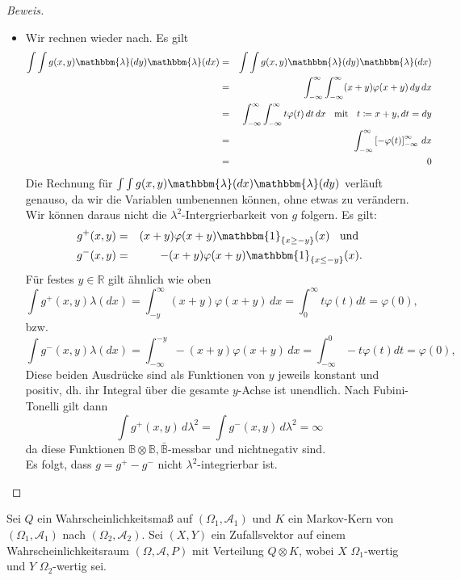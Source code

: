 \documentclass[10pt]{article}
\newcommand{\A}{\mathcal{A}}
\newenvironment{Aufgabe}[2][Aufgabe]{\begin{trivlist}
\item[\hskip \labelsep {\bfseries #1}\hskip \labelsep {\bfseries #2.}]}{\end{trivlist}}
\begin{document}
\begin{proof}[Beweis]
\begin{itemize}
\item[(ii)]
Wir rechnen wieder nach. Es gilt
\begin{eqnarray*}
\int \int g(x,y) \mathbbm{\lambda}(dy) \mathbbm{\lambda}(dx) &=& \int \int g(x,y) \mathbbm{\lambda}(dy) \mathbbm{\lambda}(dx) \\
											     &=& \int_{-\infty}^{\infty} \int_{-\infty}^{\infty} (x+y)\varphi(x+y) \, dy \,dx \\
											     &=& \int_{-\infty}^{\infty}  \int_{-\infty}^{\infty} t \varphi(t) \,dt \, dx \;\; \text{ mit } \;\; t \coloneqq x+y, dt = dy \\
											     &=& \int_{-\infty}^{\infty} \left[-\varphi(t) \right]_{-\infty}^{\infty} \,dx \\
											     &=& 0
\end{eqnarray*}
Die Rechnung für $\int \int g(x,y) \mathbbm{\lambda}(dx) \mathbbm{\lambda}(dy)$ verläuft genauso, da wir die Variablen umbenennen können, ohne etwas zu verändern. \\
Wir können daraus nicht die $\lambda^2$-Intergrierbarkeit von $g$ folgern. Es gilt:
\begin{eqnarray*}
g^+(x,y) &=&  (x+y)\varphi(x+y) \mathbbm{1}_{\{x \geq -y\}}(x) \;\; \text{ und } \\
g^-(x,y) &=&  -(x+y)\varphi(x+y) \mathbbm{1}_{\{x \leq -y\}}(x).
\end{eqnarray*}
Für festes $y \in \mathbb{R}$ gilt ähnlich wie oben
$$
\int g^+(x,y) \lambda(dx) =  \int_{-y}^{\infty} (x+y)\varphi(x+y) \, dx = \int_{0}^{\infty} t \varphi(t) dt = \varphi(0),
$$
bzw. 
$$
\int g^-(x,y) \lambda(dx) =  \int_{-\infty}^{-y} -(x+y)\varphi(x+y) \, dx = \int_{-\infty}^{0} -t \varphi(t) dt = \varphi(0),
$$
Diese beiden Ausdrücke sind als Funktionen von $y$ jeweils konstant und positiv, dh. ihr Integral über die gesamte $y$-Achse ist unendlich. Nach Fubini-Tonelli gilt dann
$$
\int g^+(x,y) \, d\lambda^2 = \int g^-(x,y) \, d\lambda^2 = \infty
$$
da diese Funktionen $\mathbb{B} \otimes \mathbb{B}, \bar{\mathbb{B}}$-messbar und nichtnegativ sind. \\
Es folgt, dass $g = g^+-g^-$ nicht $\lambda^2$-integrierbar ist.
\end{itemize}
\end{proof}


\begin{Aufgabe}{2} %
	Sei $Q$ ein Wahrscheinlichkeitsmaß auf $(\Omega_1, \A_1)$ und $K$ ein Markov-Kern von $(\Omega_1,\A_1)$ nach 
	$(\Omega_2,\A_2)$. Sei $(X,Y)$ ein Zufallsvektor auf einem Wahrscheinlichkeitsraum $(\Omega,\A,P)$ mit Verteilung 
	$Q\otimes K$, wobei $X$ $\Omega_1$-wertig und $Y$ $\Omega_2$-wertig sei. 
\end{Aufgabe}
\end{document}

